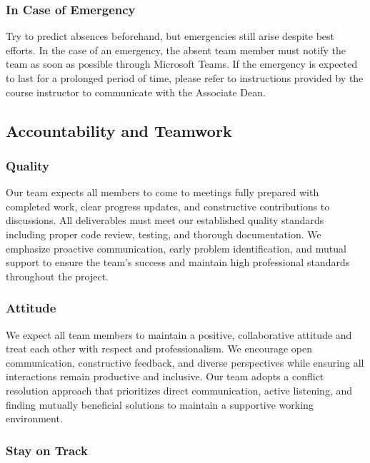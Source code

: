 \documentclass{article}
\begin{document}
\subsubsection*{In Case of Emergency}

Try to predict absences beforehand, but emergencies still arise despite best efforts.
In the case of an emergency, the absent team member must notify the team as soon as possible through Microsoft Teams.
If the emergency is expected to last for a prolonged period of time, please refer to instructions provided by the course instructor 
to communicate with the Associate Dean.

\subsection*{Accountability and Teamwork}

\subsubsection*{Quality} 

Our team expects all members to come to meetings fully prepared with completed work, 
clear progress updates, and constructive contributions to discussions.
All deliverables must meet our established quality standards including proper code review, testing, and thorough documentation. 
We emphasize proactive communication, early problem identification, and mutual support to ensure the team's success and maintain high 
professional standards throughout the project.

\subsubsection*{Attitude}

We expect all team members to maintain a positive, collaborative attitude and treat each other with respect and professionalism. 
We encourage open communication, constructive feedback, and diverse perspectives while ensuring all interactions remain productive and inclusive. 
Our team adopts a conflict resolution approach that prioritizes direct communication, active listening, and finding mutually beneficial solutions to 
maintain a supportive working environment.

\subsubsection*{Stay on Track}
\end{document}
